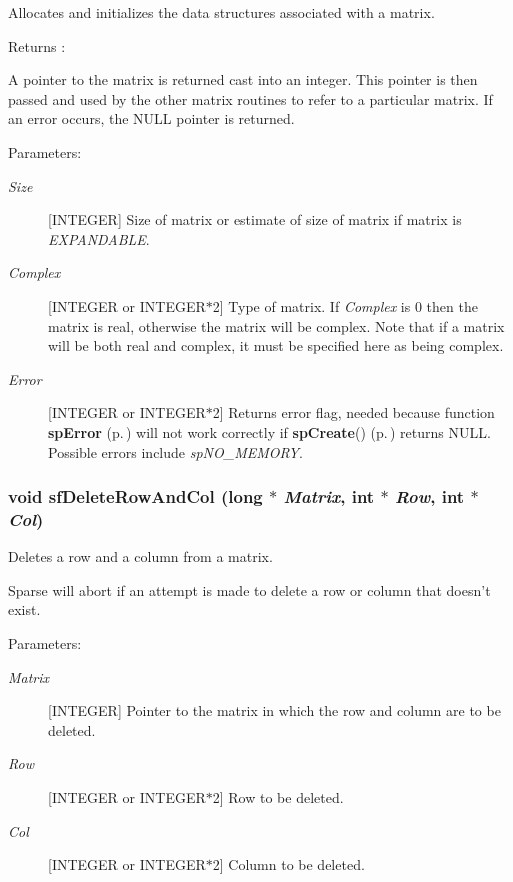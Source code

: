 Allocates and initializes the data structures associated with a matrix.

\begin{Desc}
\item[Returns :]\par
[INTEGER] A pointer to the matrix is returned cast into an integer. This pointer is then passed and used by the other matrix routines to refer to a particular matrix. If an error occurs, the NULL pointer is returned.\end{Desc}
\begin{Desc}
\item[Parameters: ]\par
\begin{description}
\item[{\em 
Size}][INTEGER] Size of matrix or estimate of size of matrix if matrix is {\em EXPANDABLE}. \item[{\em 
Complex}][INTEGER or INTEGER$\ast$2] Type of matrix. If {\em Complex} is 0 then the matrix is real, otherwise the matrix will be complex. Note that if a matrix will be both real and complex, it must be specified here as being complex. \item[{\em 
Error}][INTEGER or INTEGER$\ast$2] Returns error flag, needed because function {\bf sp\-Error} {\rm (p.\,\pageref{spMatrix_8h_a21})} will not work correctly if {\bf sp\-Create}() {\rm (p.\,\pageref{spAllocate_8c_a11})} returns NULL. Possible errors include {\em sp\-NO\_\-MEMORY}. \end{description}
\end{Desc}
\subsubsection{\setlength{\rightskip}{0pt plus 5cm}void sf\-Delete\-Row\-And\-Col (long $\ast$ {\em Matrix}, int $\ast$ {\em Row}, int $\ast$ {\em Col})}\label{spFortran_8c_a83}


Deletes a row and a column from a matrix.

Sparse will abort if an attempt is made to delete a row or column that doesn't exist.\begin{Desc}
\item[Parameters: ]\par
\begin{description}
\item[{\em 
Matrix}][INTEGER] Pointer to the matrix in which the row and column are to be deleted. \item[{\em 
Row}][INTEGER or INTEGER$\ast$2] Row to be deleted. \item[{\em 
Col}][INTEGER or INTEGER$\ast$2] Column to be deleted. \end{description}
\end{Desc}

